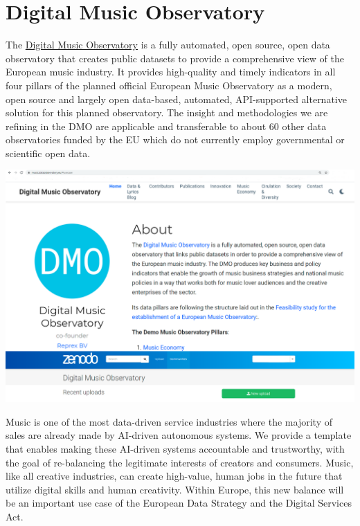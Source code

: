 \documentclass[
  a4paper,
  openany, a4paper, oneside]{book}
\begin{document}
\hypertarget{music}{%
\chapter{Digital Music Observatory}\label{music}}

The \href{https://music.dataobservatory.eu/}{Digital Music Observatory} is a fully automated, open source, open data observatory that creates public datasets to provide a comprehensive view of the European music industry. It provides high-quality and timely indicators in all four pillars of the planned official European Music Observatory as a modern, open source and largely open data-based, automated, API-supported alternative solution for this planned observatory. The insight and methodologies we are refining in the DMO are applicable and transferable to about 60 other data observatories funded by the EU which do not currently employ governmental or scientific open data.

\begin{center}\includegraphics[width=26.17in]{plots/screenshots/dmo_and_zenodo} \end{center}

Music is one of the most data-driven service industries where the majority of sales are already made by AI-driven autonomous systems. We provide a template that enables making these AI-driven systems accountable and trustworthy, with the goal of re-balancing the legitimate interests of creators and consumers. Music, like all creative industries, can create high-value, human jobs in the future that utilize digital skills and human creativity. Within Europe, this new balance will be an important use case of the European Data Strategy and the Digital Services Act.
\end{document}
